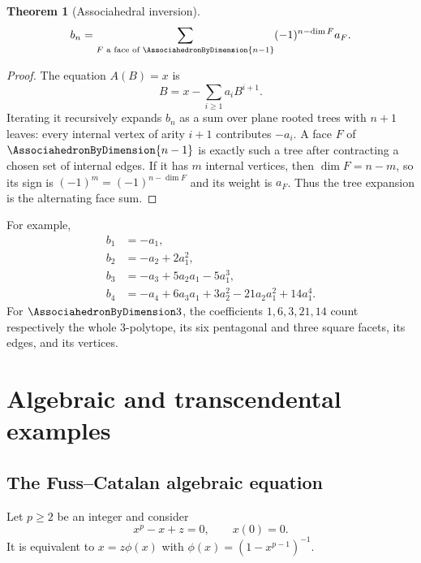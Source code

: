\documentclass[11pt,a4paper,oneside,openany]{book}
\newtheorem{theorem}{Theorem}[chapter]
\theoremstyle{definition}
\theoremstyle{remark}
\begin{document}
\begin{theorem}[Associahedral inversion]\label{thm:associahedral-inversion}
\begin{equation}\label{eq:associahedral-inversion}
 b_n=\sum_{F\text{ a face of }\AssociahedronByDimension{n-1}}(-1)^{n-\dim F}a_F.
\end{equation}
\end{theorem}
\begin{proof}
The equation $A(B)=x$ is
\[
 B=x-\sum_{i\ge1}a_iB^{i+1}.
\]
Iterating it recursively expands $b_n$ as a sum over plane rooted trees with
$n+1$ leaves: every internal vertex of arity $i+1$ contributes $-a_i$.
A face $F$ of $\AssociahedronByDimension{n-1}$ is exactly such a tree after contracting a chosen set of
internal edges.  If it has $m$ internal vertices, then
$\dim F=n-m$, so its sign is $(-1)^m=(-1)^{n-\dim F}$ and its weight is $a_F$.
Thus the tree expansion is the alternating face sum.
\end{proof}

For example,
\begin{align*}
 b_1&=-a_1,\\
 b_2&=-a_2+2a_1^2,\\
 b_3&=-a_3+5a_2a_1-5a_1^3,\\
 b_4&=-a_4+6a_3a_1+3a_2^2-21a_2a_1^2+14a_1^4.
\end{align*}
For $\AssociahedronByDimension3$, the coefficients $1,6,3,21,14$ count respectively the whole
3-polytope, its six pentagonal and three square facets, its edges, and its
vertices.

\chapter{Algebraic and transcendental examples}

\section{The Fuss--Catalan algebraic equation}
Let $p\ge2$ be an integer and consider
\begin{equation}\label{eq:fuss-equation}
 x^p-x+z=0,
 \qquad x(0)=0.
\end{equation}
It is equivalent to
$x=z\phi(x)$ with $\phi(x)=(1-x^{p-1})^{-1}$.
\end{document}
